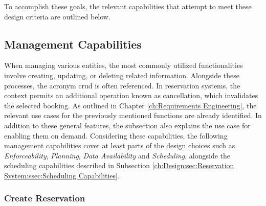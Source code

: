 \noindent To accomplish these goals, the relevant capabilities that attempt to meet these design criteria are outlined below.

\subsection{Management Capabilities}
\label{ch:Design:sec:Reservation System:ssec:Management Capabilities}

When managing various entities, the most commonly utilized functionalities involve creating, updating, or deleting related information. Alongside these processes, the acronym \acrshort{crud} is often referenced. In reservation systems, the context permits an additional operation known as cancellation, which invalidates the selected booking.
As outlined in Chapter \ref{ch:Requirements Engineering}, the relevant use cases for the previously mentioned functions are already identified. In addition to these general features, the subsection also explains the use case for enabling them on demand.
Considering these capabilities, the following management capabilities cover at least parts of the design choices such as \textit{Enforceability}, \textit{Planning}, \textit{Data Availability} and \textit{Scheduling}, alongside the scheduling capabilities described in Subsection \ref{ch:Design:sec:Reservation System:ssec:Scheduling Capabilities}.

\newpage

\subsubsection{Create Reservation}
\label{ch:Design:sec:Reservation System:ssec:Management Capabilities:sssec:Create Reservation}

